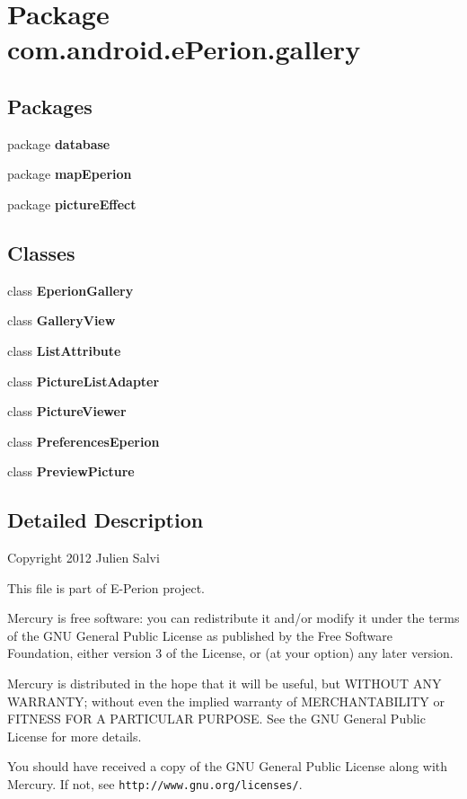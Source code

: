 \section{Package com.\-android.\-e\-Perion.\-gallery}
\label{namespacecom_1_1android_1_1e_perion_1_1gallery}
\subsection*{Packages}
\begin{DoxyCompactItemize}
\item 
package {\bf database}
\item 
package {\bf map\-Eperion}
\item 
package {\bf picture\-Effect}
\end{DoxyCompactItemize}
\subsection*{Classes}
\begin{DoxyCompactItemize}
\item 
class {\bf Eperion\-Gallery}
\item 
class {\bf Gallery\-View}
\item 
class {\bf List\-Attribute}
\item 
class {\bf Picture\-List\-Adapter}
\item 
class {\bf Picture\-Viewer}
\item 
class {\bf Preferences\-Eperion}
\item 
class {\bf Preview\-Picture}
\end{DoxyCompactItemize}


\subsection{Detailed Description}
Copyright 2012 Julien Salvi

This file is part of E-\/\-Perion project.

Mercury is free software\-: you can redistribute it and/or modify it under the terms of the G\-N\-U General Public License as published by the Free Software Foundation, either version 3 of the License, or (at your option) any later version.

Mercury is distributed in the hope that it will be useful, but W\-I\-T\-H\-O\-U\-T A\-N\-Y W\-A\-R\-R\-A\-N\-T\-Y; without even the implied warranty of M\-E\-R\-C\-H\-A\-N\-T\-A\-B\-I\-L\-I\-T\-Y or F\-I\-T\-N\-E\-S\-S F\-O\-R A P\-A\-R\-T\-I\-C\-U\-L\-A\-R P\-U\-R\-P\-O\-S\-E. See the G\-N\-U General Public License for more details.

You should have received a copy of the G\-N\-U General Public License along with Mercury. If not, see {\tt http\-://www.\-gnu.\-org/licenses/}. 
